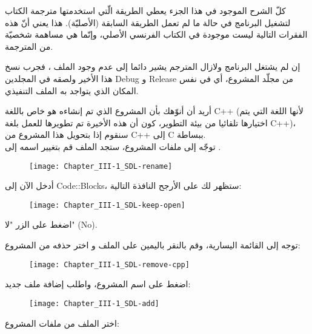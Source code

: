 \begin{tcolorbox}[breakable,title=ملاحظات مترجمة الكتاب, colback=orange!20, colframe=orange!70, fontupper=\footnotesize, coltitle=white, fonttitle=\normalsize, attach title]
كلّ الشرح الموجود في هذا الجزء يعطي الطريقة الّتي استخدمتها مترجمة الكتاب لتشغيل البرنامج في حالة ما لم تعمل الطريقة السابقة (الأصليّة). هذا يعني أنّ هذه الفقرات التالية ليست موجودة في الكتاب الفرنسي الأصلي، وإنّما هي مساهمة شخصيّة من المترجمة.
\tcblower

إن لم يشتغل البرنامج ولازال المترجم يشير دائما إلى عدم وجود الملف 
،
فجرب نسخ هذا الأخير ولصقه في المجلدين 
\textenglish{Debug}
و 
\textenglish{Release}
من مجلّد المشروع، أي في نفس المكان الذي يتواجد به الملف التنفيذي.

أريد أن أنوّهك بأن المشروع الذي تم إنشاءه هو خاص باللغة
\textenglish{C++}
(لأنها اللغة التي يتم اختيارها تلقائيا من بيئة التطوير، كون أن هذه الأخيرة تم تطويرها للعمل بلغة \textenglish{C++})،
سنقوم إذا بتحويل هذا المشروع من
\textenglish{C++}
إلى 
\textenglish{C}
ببساطة.\\
توجّه إلى ملفات المشروع، ستجد الملف
قم بتغيير اسمه إلى
.

 \begin{figure}[H]
	\centering
	\texttt{[image: Chapter\_III-1\_SDL-rename]}
\end{figure}

أدخل الآن إلى
\textenglish{Code::Blocks}،
ستظهر لك على الأرجح النافذة التالية:

 \begin{figure}[H]
	\centering
	\texttt{[image: Chapter\_III-1\_SDL-keep-open]}
\end{figure}


اضغط على الزر "لا"
(\textenglish{No}).

توجه إلى القائمة اليسارية، وقم بالنقر باليمين على الملف
و اختر حذفه من المشروع:

\begin{figure}[H]
	\centering
	\texttt{[image: Chapter\_III-1\_SDL-remove-cpp]}
\end{figure}

اضغط على اسم المشروع، واطلب إضافة ملف جديد:

\begin{figure}[H]
	\centering
	\texttt{[image: Chapter\_III-1\_SDL-add]}
\end{figure}

اختر الملف
من ملفات المشروع:


\end{tcolorbox}
